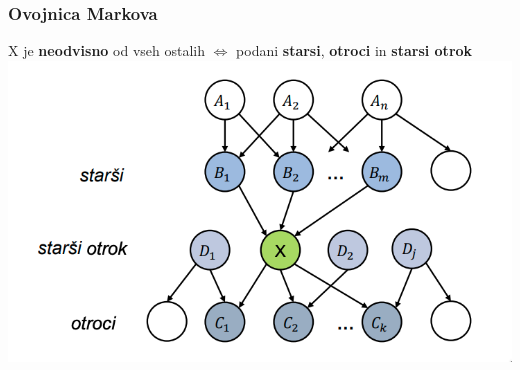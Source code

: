 \subsubsection{Ovojnica Markova}
X je \textbf{neodvisno} od vseh ostalih $\Leftrightarrow$ podani \textbf{starsi}, \textbf{otroci} in \textbf{starsi otrok}\\
\includegraphics[width=\columnwidth]{images/ovojnica-markova.png}
